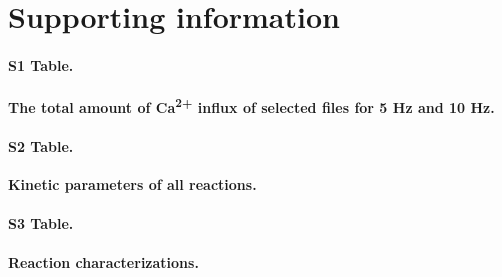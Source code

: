 \documentclass[10pt,letterpaper]{article}
\begin{document}
\section*{Supporting information}





\paragraph*{S1 Table.}
\label{S1_Table}
{\bf The total amount of Ca\textsuperscript{2+} influx of selected files for 5 Hz and 10 Hz.} 
\paragraph*{S2 Table.}
\label{S2_Table}
{\bf Kinetic parameters of all reactions.}
\paragraph*{S3 Table.}
\label{S3_Table}
{\bf Reaction characterizations.}
\end{document}
